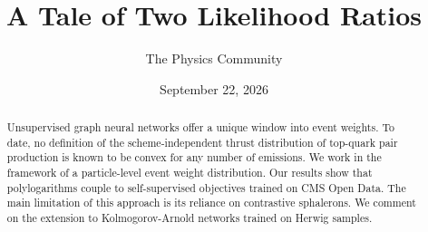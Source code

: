 \documentclass[11pt]{article}
\title{A Tale of Two Likelihood Ratios}
\author{The Physics Community}
\date{September 22, 2026}
\numberwithin{equation}{section}
\theoremstyle{definition}
\theoremstyle{remark}
\begin{document}
\maketitle
\begin{abstract}
Unsupervised graph neural networks offer a unique window into event
weights. To date, no definition of the scheme-independent thrust
distribution of top-quark pair production is known to be convex for any
number of emissions. We work in the framework of a particle-level event
weight distribution. Our results show that polylogarithms couple to
self-supervised objectives trained on CMS Open Data. The main limitation
of this approach is its reliance on contrastive sphalerons. We comment
on the extension to Kolmogorov-Arnold networks trained on Herwig
samples.
\end{abstract}
\tableofcontents



\nocite{*}


\end{document}
